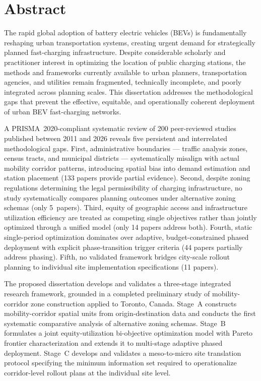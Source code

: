 \documentclass[12pt,letterpaper]{article}
\begin{document}
\section*{Abstract}

The rapid global adoption of battery electric vehicles (BEVs) is
fundamentally reshaping urban transportation systems, creating urgent
demand for strategically planned fast-charging infrastructure.  Despite
considerable scholarly and practitioner interest in optimizing the
location of public charging stations, the methods and frameworks
currently available to urban planners, transportation agencies, and
utilities remain fragmented, technically incomplete, and poorly
integrated across planning scales.  This dissertation addresses the
methodological gaps that prevent the effective, equitable, and
operationally coherent deployment of urban BEV fast-charging networks.

A PRISMA~2020-compliant systematic review of 200 peer-reviewed studies
published between 2011 and 2026 reveals five persistent and interrelated
methodological gaps.  First, administrative boundaries --- traffic
analysis zones, census tracts, and municipal districts --- systematically
misalign with actual mobility corridor patterns, introducing spatial bias
into demand estimation and station placement (133 papers provide partial
evidence).  Second, despite zoning regulations determining the legal
permissibility of charging infrastructure, no study systematically
compares planning outcomes under alternative zoning schemas (only
5~papers).  Third, equity of geographic access and infrastructure
utilization efficiency are treated as competing single objectives rather
than jointly optimized through a unified model (only 14 papers address
both).  Fourth, static single-period optimization dominates over
adaptive, budget-constrained phased deployment with explicit
phase-transition trigger criteria (44 papers partially address phasing).
Fifth, no validated framework bridges city-scale rollout planning to
individual site implementation specifications (11 papers).

The proposed dissertation develops and validates a three-stage integrated
research framework, grounded in a completed preliminary study of
mobility-corridor zone construction applied to Toronto, Canada.
Stage~A constructs mobility-corridor spatial units from origin-destination
data and conducts the first systematic comparative analysis of alternative
zoning schemas.  Stage~B formulates a joint equity-utilization
bi-objective optimization model with Pareto frontier characterization
and extends it to multi-stage adaptive phased deployment.  Stage~C
develops and validates a meso-to-micro site translation protocol
specifying the minimum information set required to operationalize
corridor-level rollout plans at the individual site level.
\end{document}
